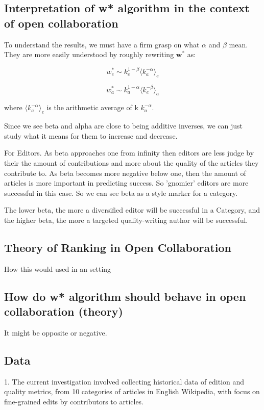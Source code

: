 \documentclass{acm_proc_article-sp}
\begin{document}
\subsection{Interpretation of w* algorithm in the context of open collaboration}

To understand the results, we must have a firm grasp on what $\alpha$ and $\beta$ mean. They are more easily understood by roughly rewriting $\mathbf{w^*}$ as:

$$w^{*}_{e} \sim k^{1-\beta}_{e} \langle k_{a}^{-\alpha}\rangle_e $$


$$w^{*}_{a} \sim k^{1-\alpha}_{a} \langle k_{e}^{-\beta}\rangle_a $$

where $\langle k_{a}^{-\alpha}\rangle_e$ is the arithmetic average of k  $k_{a}^{-\alpha}$. 

Since we see beta and alpha are close to being additive inverses, we can just study what it means for them to increase and decrease.

For Editors.
As beta approaches one from infinity then editors are less judge by their the amount of contributions and more about the quality of the articles they contribute to. As beta becomes more negative below one, then the amount of articles is more important in predicting success.  So 'gnomier' editors are more successful in this case. So we can see beta as a style marker for a category.

The lower beta, the more a diversified editor will be successful in a Category, and the higher beta, the more a targeted quality-writing author will be successful.


\subsection{Theory of Ranking in Open Collaboration}
How this would used in an setting

\subsection{How do w* algorithm should behave in open collaboration (theory)}

It might be opposite or negative.

\subsection{Data}
1. The current investigation involved collecting historical data of edition and quality metrics, from 10 categories of articles in English Wikipedia, with focus on fine-grained edits by contributors to articles.
\end{document}
